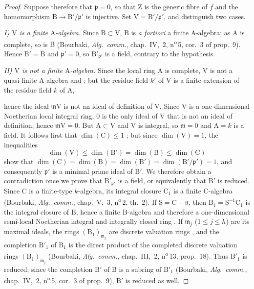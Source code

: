 \begin{proof}
Suppose therefore that $\mathfrak{p}=0$, so that $\mathrm{Z}$ is the generic fibre of $f$ and the homomorphism $\mathrm{B}\to\mathrm{B}'/\mathfrak{p}'$ is injective. Set $\mathrm{V}=\mathrm{B}'/\mathfrak{p}'$, and distinguish two cases.

\emph{I) $\mathrm{V}$ is a finite $\mathrm{A}$-algebra.} Since $\mathrm{B}\subset\mathrm{V}$, $\mathrm{B}$ is \emph{a fortiori} a finite $\mathrm{A}$-algebra; as $\mathrm{A}$ is complete, so is $\mathrm{B}$ (Bourbaki, \emph{Alg.\ comm.}, chap.~IV, \textsection\,2, n\textsuperscript{o}\,5, cor.~3 of prop.~9). Hence $\mathrm{B}'=\mathrm{B}$ and $\mathfrak{p}'=0$, so $\mathrm{B}'_{\mathfrak{p}'}$ is a field, contrary to the hypothesis.

\emph{II) $\mathrm{V}$ is not a finite $\mathrm{A}$-algebra.} Since the local ring $\mathrm{A}$ is complete, $\mathrm{V}$ is not a quasi-finite $\mathrm{A}$-algebra  and ; but the residue field $k'$ of $\mathrm{V}$ is a finite extension of the residue field $k$ of $\mathrm{A}$,


hence  the ideal $\mathfrak{m}\mathrm{V}$ is not an ideal of definition of $\mathrm{V}$. Since $\mathrm{V}$ is a one-dimensional Noetherian local integral ring, $0$ is the only ideal of $\mathrm{V}$ that is not an ideal of definition, hence $\mathfrak{m}\mathrm{V}=0$. But $\mathrm{A}\subset\mathrm{V}$ and $\mathrm{V}$ is integral, so $\mathfrak{m}=0$ and $\mathrm{A}=k$ is a field.
It follows first that $\dim(\mathrm{C})\leqslant 1$ ; but since $\dim(\mathrm{V})=1$, the inequalities
\[
  \dim(\mathrm{V})\leqslant\dim(\mathrm{B}')=\dim(\mathrm{B})\leqslant\dim(\mathrm{C})
\]
show that $\dim(\mathrm{C})=\dim(\mathrm{B})=\dim(\mathrm{B}')=\dim(\mathrm{B}'/\mathfrak{p}')=1$, and consequently $\mathfrak{p}'$ is a minimal prime ideal of $\mathrm{B}'$. We therefore obtain a contradiction once we prove that $\mathrm{B}'_{\mathfrak{p}'}$ is a field, or equivalently that $\mathrm{B}'$ is reduced.
Since $\mathrm{C}$ is a finite-type $k$-algebra, its integral closure $\mathrm{C}_1$ is a finite $\mathrm{C}$-algebra (Bourbaki, \emph{Alg.\ comm.}, chap.~V, \textsection\,3, n\textsuperscript{o}\,2, th.~2). If $\mathrm{S}=\mathrm{C}-\mathfrak{n}$, then $\mathrm{B}_1=\mathrm{S}^{-1}\mathrm{C}_1$ is the integral closure of $\mathrm{B}$, hence a finite $\mathrm{B}$-algebra and therefore a one-dimensional semi-local Noetherian integral and integrally closed ring . If $\mathfrak{m}_j$ ($1\leqslant j\leqslant h$) are its maximal ideals, the rings $(\mathrm{B}_1)_{\mathfrak{m}_j}$ are discrete valuation rings , and the completion $\mathrm{B}'_1$ of $\mathrm{B}_1$ is the direct product of the completed discrete valuation rings $(\mathrm{B}_1)_{\mathfrak{m}_j}$ (Bourbaki, \emph{Alg.\ comm.}, chap.~III, \textsection\,2, n\textsuperscript{o}\,13, prop.~18). Thus $\mathrm{B}'_1$ is reduced; since the completion $\mathrm{B}'$ of $\mathrm{B}$ is a subring of $\mathrm{B}'_1$ (Bourbaki, \emph{Alg.\ comm.}, chap.~IV, \textsection\,2, n\textsuperscript{o}\,5, cor.~3 of prop.~9), $\mathrm{B}'$ is reduced as well.
\end{proof}

